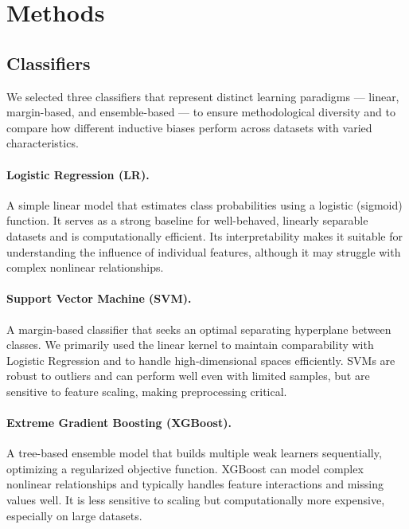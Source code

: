 \documentclass[12pt,a4paper]{article}
\begin{document}
\newpage

\section{Methods}
\label{sec:Methods}
\subsection{Classifiers}
We selected three classifiers that represent distinct learning paradigms — linear, margin-based, and ensemble-based — to ensure methodological diversity and to compare how different inductive biases perform across datasets with varied characteristics.

\paragraph{Logistic Regression (LR).}
A simple linear model that estimates class probabilities using a logistic (sigmoid) function. It serves as a strong baseline for well-behaved, linearly separable datasets and is computationally efficient. Its interpretability makes it suitable for understanding the influence of individual features, although it may struggle with complex nonlinear relationships.

\paragraph{Support Vector Machine (SVM).}
A margin-based classifier that seeks an optimal separating hyperplane between classes. We primarily used the linear kernel to maintain comparability with Logistic Regression and to handle high-dimensional spaces efficiently. SVMs are robust to outliers and can perform well even with limited samples, but are sensitive to feature scaling, making preprocessing critical.

\paragraph{Extreme Gradient Boosting (XGBoost).}
A tree-based ensemble model that builds multiple weak learners sequentially, optimizing a regularized objective function. XGBoost can model complex nonlinear relationships and typically handles feature interactions and missing values well. It is less sensitive to scaling but computationally more expensive, especially on large datasets.

\vspace{0.5cm}
\end{document}
